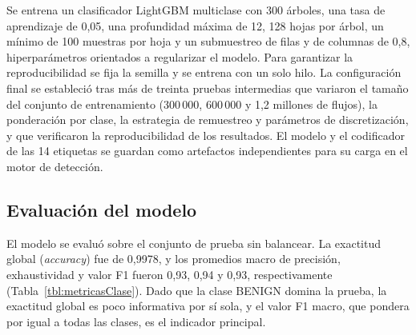 Se entrena un clasificador LightGBM multiclase \parencite{lightgbm2017} con 300 árboles, una tasa de aprendizaje de 0,05, una profundidad máxima de 12, 128 hojas por árbol, un mínimo de 100 muestras por hoja y un submuestreo de filas y de columnas de 0,8, hiperparámetros orientados a regularizar el modelo. Para garantizar la reproducibilidad se fija la semilla y se entrena con un solo hilo. La configuración final se estableció tras más de treinta pruebas intermedias que variaron el tamaño del conjunto de entrenamiento (300\,000, 600\,000 y 1,2 millones de flujos), la ponderación por clase, la estrategia de remuestreo y parámetros de discretización, y que verificaron la reproducibilidad de los resultados. El modelo y el codificador de las 14 etiquetas se guardan como artefactos independientes para su carga en el motor de detección.

\subsection{Evaluación del modelo}

El modelo se evaluó sobre el conjunto de prueba sin balancear. La exactitud global (\emph{accuracy}) fue de 0,9978, y los promedios macro de precisión, exhaustividad y valor F1 fueron 0,93, 0,94 y 0,93, respectivamente (Tabla~\ref{tbl:metricasClase}). Dado que la clase BENIGN domina la prueba, la exactitud global es poco informativa por sí sola, y el valor F1 macro, que pondera por igual a todas las clases, es el indicador principal.

